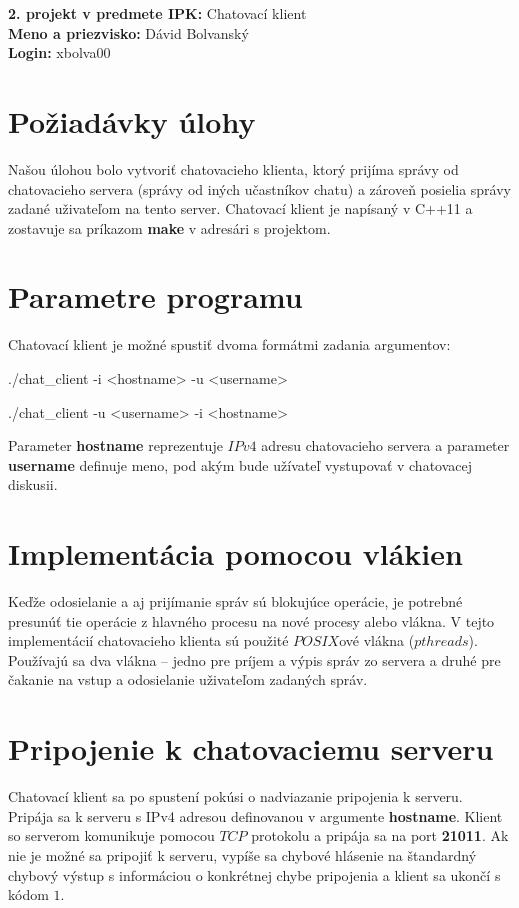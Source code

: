 \documentclass[10pt,a4paper]{article}
\author{Dávid Bolvanský}
\begin{document}
	\noindent
	\textbf{2. projekt v predmete IPK:} Chatovací klient\\
	\textbf{Meno a priezvisko:} Dávid Bolvanský\\
	\textbf{Login:} xbolva00

\section{Požiadávky úlohy}
	Našou úlohou bolo vytvoriť chatovacieho klienta, ktorý prijíma správy od chatovacieho servera (správy od iných učastníkov chatu) a zároveň posielia správy zadané uživateľom na tento server. Chatovací klient je napísaný v C++11 a zostavuje sa príkazom \textbf{make} v adresári s projektom.
	
\section{Parametre programu}
	Chatovací klient je možné spustiť dvoma formátmi zadania argumentov:
	\begin{framed}
	./chat\_client -i <hostname> -u <username>
	\end{framed}
	\begin{framed}
	./chat\_client -u <username> -i <hostname>
	\end{framed}

	Parameter \textbf{hostname} reprezentuje $IPv4$ adresu chatovacieho servera a parameter 
	\textbf{username} definuje meno, pod akým bude užívateľ vystupovať v chatovacej diskusii.
	
\section{Implementácia pomocou vlákien}
	Keďže odosielanie a aj prijímanie správ sú blokujúce operácie, je potrebné presunúť tie operácie z hlavného procesu na nové procesy alebo vlákna. V tejto implementácií chatovacieho klienta sú použité $POSIX$ové vlákna ($pthreads$). Používajú sa dva vlákna -- jedno pre príjem a výpis správ zo servera a druhé pre čakanie na vstup a odosielanie uživateľom zadaných správ.

\section{Pripojenie k chatovaciemu serveru}
	Chatovací klient sa po spustení pokúsi o nadviazanie pripojenia k serveru. Pripája sa k serveru s IPv4 adresou definovanou v argumente \textbf{hostname}. Klient so serverom komunikuje pomocou $TCP$ protokolu a pripája sa na port \textbf{21011}. Ak nie je možné sa pripojiť k serveru, vypíše sa chybové hlásenie na štandardný chybový výstup s informáciou o konkrétnej chybe pripojenia a klient sa ukončí s kódom $1$.
\end{document}
